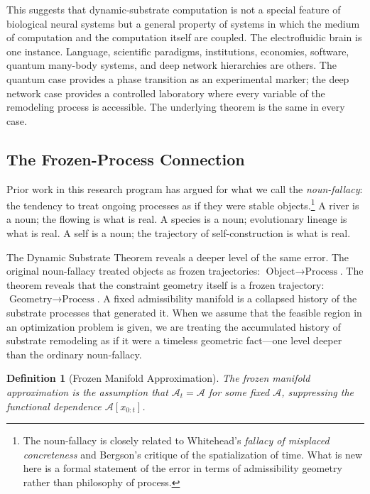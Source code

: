 \documentclass[12pt,a4paper]{article}
\newtheorem{definition}[theorem]{Definition}
\begin{document}
This suggests that dynamic-substrate computation is not a special feature of biological neural systems but a general property of systems in which the medium of computation and the computation itself are coupled. The electrofluidic brain is one instance. Language, scientific paradigms, institutions, economies, software, quantum many-body systems, and deep network hierarchies are others. The quantum case provides a phase transition as an experimental marker; the deep network case provides a controlled laboratory where every variable of the remodeling process is accessible. The underlying theorem is the same in every case.

\subsection{The Frozen-Process Connection}
\label{sec:consequences}

Prior work in this research program has argued for what we call the \emph{noun-fallacy}: the tendency to treat ongoing processes as if they were stable objects.\footnote{The noun-fallacy is closely related to Whitehead's \emph{fallacy of misplaced concreteness} and Bergson's critique of the spatialization of time. What is new here is a formal statement of the error in terms of admissibility geometry rather than philosophy of process.} A river is a noun; the flowing is what is real. A species is a noun; evolutionary lineage is what is real. A self is a noun; the trajectory of self-construction is what is real.

The Dynamic Substrate Theorem reveals a deeper level of the same error. The original noun-fallacy treated objects as frozen trajectories: $\text{Object} \to \text{Process}$. The theorem reveals that the constraint geometry itself is a frozen trajectory: $\text{Geometry} \to \text{Process}$. A fixed admissibility manifold is a collapsed history of the substrate processes that generated it. When we assume that the feasible region in an optimization problem is given, we are treating the accumulated history of substrate remodeling as if it were a timeless geometric fact---one level deeper than the ordinary noun-fallacy.

\begin{definition}[Frozen Manifold Approximation]
The frozen manifold approximation is the assumption that $\mathcal{A}_t = \mathcal{A}$ for some fixed $\mathcal{A}$, suppressing the functional dependence $\mathcal{A}[x_{0:t}]$.
\end{definition}
\end{document}
